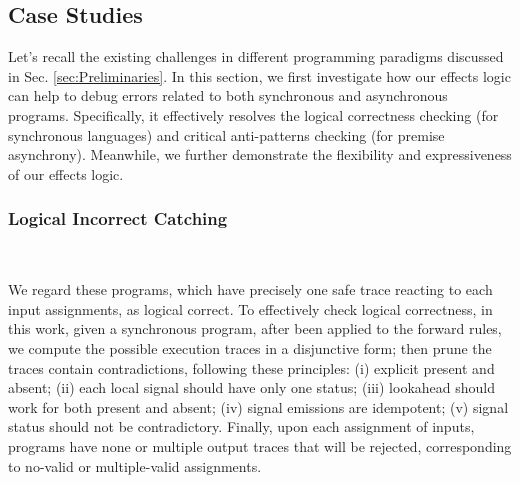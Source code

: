 \documentclass[acmsmall,review,anonymous]{acmart}\settopmatter{printfolios=true,printccs=false,printacmref=false}
\newcommand\secref[1]{Sec. \textcolor{black}{\ref{#1}}}
\begin{document}
\subsection{Case Studies}
\label{subsec:Case_Studies}

Let's recall the existing challenges in different programming paradigms discussed in \secref{sec:Preliminaries}. In this section, we first investigate how our effects logic can help to debug errors related to both synchronous and asynchronous programs. Specifically, it effectively resolves the logical correctness checking (for synchronous languages) and critical anti-patterns checking (for premise asynchrony). 
Meanwhile, we further demonstrate the flexibility and expressiveness of our effects logic. 




\subsubsection{Logical Incorrect Catching}~\\
\label{subsec:LogicalIncorrectCatching}

      \vspace{-2mm}

We regard these programs, which have precisely one safe trace reacting to each input assignments, as logical correct. 
To effectively check logical correctness, in this work, given a synchronous  program, after been applied to the forward rules, we compute the possible execution traces in a disjunctive form; then prune the traces contain contradictions, following these principles: (i) explicit present and absent; (ii) each local signal should have
only one status; (iii) lookahead should work for both present and absent; (iv) signal emissions are idempotent; (v) signal status should not be contradictory.
Finally, upon each assignment of inputs, programs have none or multiple output traces that will be rejected, corresponding to no-valid or multiple-valid assignments. 
\end{document}
